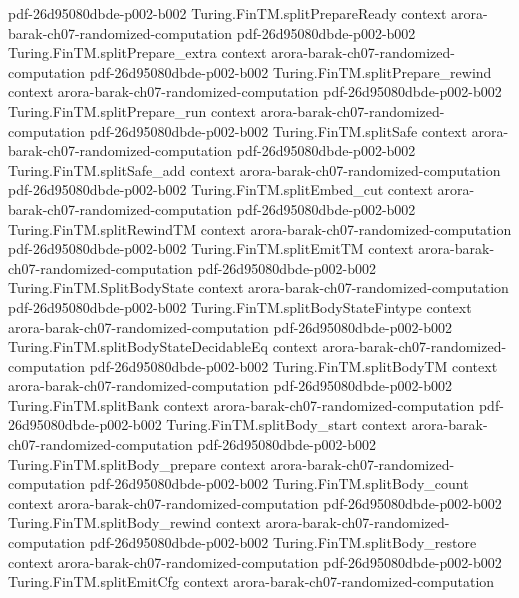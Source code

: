 \begin{theorem}
  {pdf-26d95080dbde-p002-b002}
\proofstep
  {Turing.FinTM.splitPrepareReady}
  {context}
  {arora-barak-ch07-randomized-computation}
  {pdf-26d95080dbde-p002-b002}
\proofstep
  {Turing.FinTM.splitPrepare_extra}
  {context}
  {arora-barak-ch07-randomized-computation}
  {pdf-26d95080dbde-p002-b002}
\proofstep
  {Turing.FinTM.splitPrepare_rewind}
  {context}
  {arora-barak-ch07-randomized-computation}
  {pdf-26d95080dbde-p002-b002}
\proofstep
  {Turing.FinTM.splitPrepare_run}
  {context}
  {arora-barak-ch07-randomized-computation}
  {pdf-26d95080dbde-p002-b002}
\proofstep
  {Turing.FinTM.splitSafe}
  {context}
  {arora-barak-ch07-randomized-computation}
  {pdf-26d95080dbde-p002-b002}
\proofstep
  {Turing.FinTM.splitSafe_add}
  {context}
  {arora-barak-ch07-randomized-computation}
  {pdf-26d95080dbde-p002-b002}
\proofstep
  {Turing.FinTM.splitEmbed_cut}
  {context}
  {arora-barak-ch07-randomized-computation}
  {pdf-26d95080dbde-p002-b002}
\proofstep
  {Turing.FinTM.splitRewindTM}
  {context}
  {arora-barak-ch07-randomized-computation}
  {pdf-26d95080dbde-p002-b002}
\proofstep
  {Turing.FinTM.splitEmitTM}
  {context}
  {arora-barak-ch07-randomized-computation}
  {pdf-26d95080dbde-p002-b002}
\proofstep
  {Turing.FinTM.SplitBodyState}
  {context}
  {arora-barak-ch07-randomized-computation}
  {pdf-26d95080dbde-p002-b002}
\proofstep
  {Turing.FinTM.splitBodyStateFintype}
  {context}
  {arora-barak-ch07-randomized-computation}
  {pdf-26d95080dbde-p002-b002}
\proofstep
  {Turing.FinTM.splitBodyStateDecidableEq}
  {context}
  {arora-barak-ch07-randomized-computation}
  {pdf-26d95080dbde-p002-b002}
\proofstep
  {Turing.FinTM.splitBodyTM}
  {context}
  {arora-barak-ch07-randomized-computation}
  {pdf-26d95080dbde-p002-b002}
\proofstep
  {Turing.FinTM.splitBank}
  {context}
  {arora-barak-ch07-randomized-computation}
  {pdf-26d95080dbde-p002-b002}
\proofstep
  {Turing.FinTM.splitBody_start}
  {context}
  {arora-barak-ch07-randomized-computation}
  {pdf-26d95080dbde-p002-b002}
\proofstep
  {Turing.FinTM.splitBody_prepare}
  {context}
  {arora-barak-ch07-randomized-computation}
  {pdf-26d95080dbde-p002-b002}
\proofstep
  {Turing.FinTM.splitBody_count}
  {context}
  {arora-barak-ch07-randomized-computation}
  {pdf-26d95080dbde-p002-b002}
\proofstep
  {Turing.FinTM.splitBody_rewind}
  {context}
  {arora-barak-ch07-randomized-computation}
  {pdf-26d95080dbde-p002-b002}
\proofstep
  {Turing.FinTM.splitBody_restore}
  {context}
  {arora-barak-ch07-randomized-computation}
  {pdf-26d95080dbde-p002-b002}
\proofstep
  {Turing.FinTM.splitEmitCfg}
  {context}
  {arora-barak-ch07-randomized-computation}

\end{theorem}
